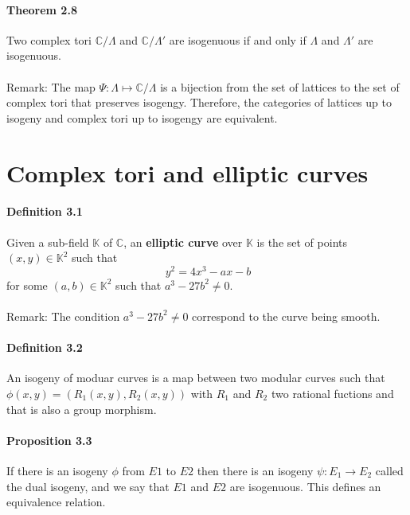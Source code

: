 \documentclass[letterpaper,10pt]{article}
\begin{document}
\paragraph{Theorem 2.8}  Two complex tori $\mathbb{C} / \Lambda$ and $\mathbb{C} / \Lambda'$ are isogenuous if and only if  $\Lambda$ and $\Lambda'$ are isogenuous.


{\itshape \paragraph{}Remark: The map  $\Psi: \Lambda \mapsto \mathbb{C}/\Lambda$ is  a bijection from the set of lattices to the set of complex tori that preserves isogengy. 
Therefore, the categories of lattices up to isogeny and complex tori up to isogengy are equivalent.
}
\section{Complex tori and elliptic curves}%
\paragraph{Definition 3.1} Given a sub-field $\mathbb{K}$ of $\mathbb{C}$, an \textbf{elliptic curve} over $\mathbb{K}$ is the set of points $(x,y) \in \mathbb{K}^2$ such that 
\[\ y^2 = 4x^3 - ax - b \] for some $(a,b) \in \mathbb{K}^2$ such that $a^3-27b^2 \neq 0$.
{\itshape \paragraph{} Remark: The condition $a^3-27b^2 \neq 0$ correspond to the curve being smooth.
}

\paragraph{Definition 3.2} An isogeny of moduar curves is a map  between two modular curves such that $ \phi(x,y) = (R_1(x,y),R_2(x,y))$ 
with $R_1$ and $R_2$ two rational fuctions and that is also a group morphism.

\paragraph{Proposition 3.3} If there is an isogeny $\phi$ from $E1$ to $E2$ then there is an isogeny
$\psi : E_1 \to E_2$ called the dual isogeny, and we say that $E1$ and $E2$ are isogenuous.
This defines an equivalence relation.
\end{document}
